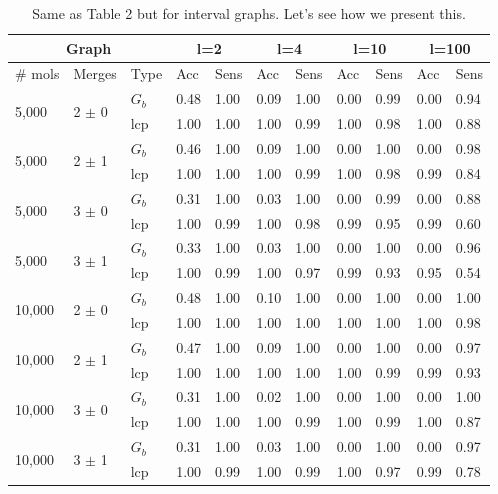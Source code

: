 \documentclass[a4paper,UKenglish,cleveref, autoref, thm-restate,authorcolumns]{lipics-v2019}
\begin{document}
\begin{table}

\begin{tabular}{|p{1cm}|p{1cm}|p{.7cm}||p{1cm}|p{1cm}|p{1cm}|p{1cm}|p{1cm}|p{1cm}|p{1cm}|p{1cm}|  }
 \hline
   \multicolumn{3}{|c||}{\textbf{Graph}}
   & \multicolumn{2}{c|}{\textbf{l=2}}
   & \multicolumn{2}{c|}{\textbf{l=4}} 
   & \multicolumn{2}{c|}{\textbf{l=10}}
   & \multicolumn{2}{c|}{\textbf{l=100}} 
   \\
 \hline
\# mols & Merges & Type  & Acc & Sens & Acc & Sens & Acc & Sens & Acc & Sens \\

    \hline
    \hline
    \multirow{2}{*}{5,000} & \multirow{2}{*}{2 $\pm$ 0} & $G_b$ & 0.48 & 1.00 & 0.09 & 1.00 & 0.00 & 0.99 & 0.00 & 0.94\\
     & & lcp & 1.00 & 1.00 & 1.00  & 0.99 & 1.00 & 0.98 & 1.00 & 0.88 \\
    \hline
    \multirow{2}{*}{5,000} & \multirow{2}{*}{2 $\pm$ 1} & $G_b$ & 0.46 & 1.00 & 0.09 & 1.00 & 0.00 & 1.00 & 0.00 & 0.98\\
    & & lcp & 1.00 & 1.00 & 1.00 & 0.99 & 1.00 & 0.98 & 0.99 & 0.84 \\
    \hline
    \multirow{2}{*}{5,000} & \multirow{2}{*}{3 $\pm$ 0} & $G_b$ & 0.31 & 1.00 & 0.03 & 1.00 & 0.00 & 0.99 & 0.00 & 0.88\\
    & &  lcp& 1.00&  0.99 & 1.00 & 0.98 & 0.99 & 0.95 & 0.99 & 0.60 \\
    \hline
    \multirow{2}{*}{5,000} & \multirow{2}{*}{3 $\pm$ 1} & $G_b$ & 0.33 & 1.00 & 0.03 & 1.00 & 0.00 & 1.00 & 0.00&  0.96\\
    & & lcp & 1.00 & 0.99 & 1.00 & 0.97 & 0.99 & 0.93 & 0.95 & 0.54 \\
    \hline
    \multirow{2}{*}{10,000} & \multirow{2}{*}{2 $\pm$ 0} & $G_b$ & 0.48 & 1.00 & 0.10 & 1.00 & 0.00 & 1.00 & 0.00 & 1.00\\
    & & lcp & 1.00 & 1.00 & 1.00 & 1.00 & 1.00 & 1.00 & 1.00 & 0.98 \\
    \hline
    \multirow{2}{*}{10,000} & \multirow{2}{*}{2 $\pm$ 1} & $G_b$ & 0.47 & 1.00 & 0.09 & 1.00 & 0.00 & 1.00 & 0.00  & 0.97\\
    & & lcp & 1.00 & 1.00 & 1.00 & 1.00 & 1.00 & 0.99 & 0.99 &  0.93 \\
    \hline
    \multirow{2}{*}{10,000} & \multirow{2}{*}{3 $\pm$ 0} & $G_b$ & 0.31&  1.00 & 0.02 & 1.00 & 0.00 & 1.00 & 0.00  &1.00\\
    & & lcp & 1.00 & 1.00 & 1.00 & 0.99 & 1.00 & 0.99 & 1.00 & 0.87\\
    \hline
    \multirow{2}{*}{10,000} & \multirow{2}{*}{3 $\pm$ 1} & $G_b$  &0.31 & 1.00 & 0.03 & 1.00 & 0.00 & 1.00 & 0.00  &0.97\\
    & & lcp & 1.00 & 0.99 & 1.00 & 0.99 & 1.00 & 0.97 & 0.99  & 0.78\\
    \hline
 \end{tabular}
\caption{Same as Table 2 but for interval graphs. Let's see how we present this.\label{tab:simu_accsens}}
\end{table}
\end{document}
